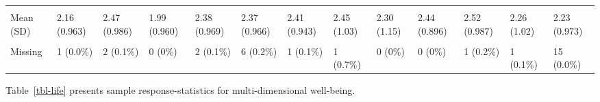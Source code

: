 \documentclass[
  single column]{article}
\begin{document}
\begin{landscape}
\begin{longtable}[t]{lllllllllllll}
\cellcolor{gray!10}{Social Dominance Orientation} & \cellcolor{gray!10}{} & \cellcolor{gray!10}{} & \cellcolor{gray!10}{} & \cellcolor{gray!10}{} & \cellcolor{gray!10}{} & \cellcolor{gray!10}{} & \cellcolor{gray!10}{} & \cellcolor{gray!10}{} & \cellcolor{gray!10}{} & \cellcolor{gray!10}{} & \cellcolor{gray!10}{} & \cellcolor{gray!10}{}\\
\addlinespace
Mean (SD) & 2.16 (0.963) & 2.47 (0.986) & 1.99 (0.960) & 2.38 (0.969) & 2.37 (0.966) & 2.41 (0.943) & 2.45 (1.03) & 2.30 (1.15) & 2.44 (0.896) & 2.52 (0.987) & 2.26 (1.02) & 2.23 (0.973)\\
\cellcolor{gray!10}{Median [Min, Max]} & \cellcolor{gray!10}{2.00 [1.00, 7.00]} & \cellcolor{gray!10}{2.33 [1.00, 6.33]} & \cellcolor{gray!10}{1.80 [1.00, 5.67]} & \cellcolor{gray!10}{2.33 [1.00, 6.00]} & \cellcolor{gray!10}{2.33 [1.00, 7.00]} & \cellcolor{gray!10}{2.33 [1.00, 5.67]} & \cellcolor{gray!10}{2.33 [1.00, 6.80]} & \cellcolor{gray!10}{2.00 [1.00, 5.67]} & \cellcolor{gray!10}{2.33 [1.00, 5.33]} & \cellcolor{gray!10}{2.50 [1.00, 6.67]} & \cellcolor{gray!10}{2.17 [1.00, 7.00]} & \cellcolor{gray!10}{2.17 [1.00, 7.00]}\\
Missing & 1 (0.0\%) & 2 (0.1\%) & 0 (0\%) & 2 (0.1\%) & 6 (0.2\%) & 1 (0.1\%) & 1 (0.7\%) & 0 (0\%) & 0 (0\%) & 1 (0.2\%) & 1 (0.1\%) & 15 (0.0\%)\\*

\end{longtable}

\endgroup{}


\end{landscape}

\newpage{}

\newpage{}

Table~\ref{tbl-life} presents sample response-statistics for
multi-dimensional well-being.
\end{document}
